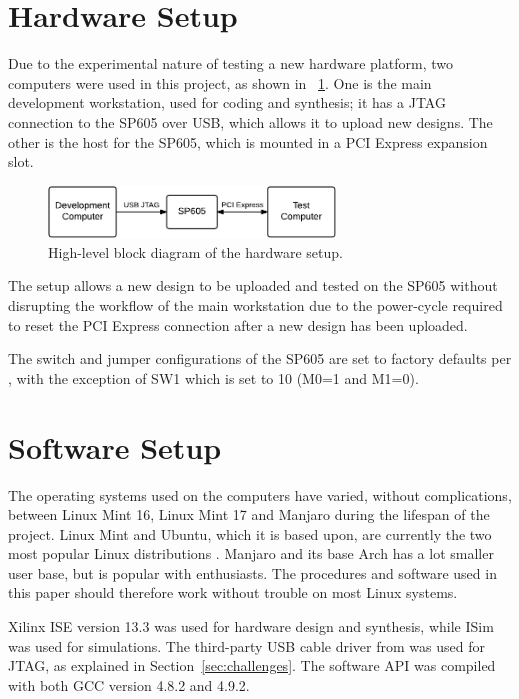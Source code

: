 \section{Hardware Setup}

Due to the experimental nature of testing a new hardware platform, two computers were used in this project, as shown in \figurename~\ref{fig:hardware-setup}.
One is the main development workstation, used for coding and synthesis; it has a JTAG connection to the SP605 over USB, which allows it to upload new designs.
The other is the host for the SP605, which is mounted in a PCI Express expansion slot.

\begin{figure}[!ht]
    \centering
    \includegraphics[width=0.68\textwidth]{figures/hardware-setup}
    \caption[Hardware setup]{
        High-level block diagram of the hardware setup.
    }
    \label{fig:hardware-setup}
\end{figure}

The setup allows a new design to be uploaded and tested on the SP605 without disrupting the workflow of the main workstation due to the power-cycle required to reset the PCI Express connection after a new design has been uploaded.

The switch and jumper configurations of the SP605 are set to factory defaults per \cite{ug526}, with the exception of SW1 which is set to 10 (M0=1 and M1=0).

\section{Software Setup}

The operating systems used on the computers have varied, without complications, between Linux Mint 16, Linux Mint 17 and Manjaro during the lifespan of the project.
Linux Mint and Ubuntu, which it is based upon, are currently the two most popular Linux distributions \cite{distrowatch}.
Manjaro and its base Arch has a lot smaller user base, but is popular with enthusiasts.
The procedures and software used in this paper should therefore work without trouble on most Linux systems.

Xilinx ISE version 13.3 was used for hardware design and synthesis, while ISim was used for simulations.
The third-party USB cable driver from \cite{usbdriver} was used for JTAG, as explained in Section~\ref{sec:challenges}.
The software API was compiled with both GCC version 4.8.2 and 4.9.2.

